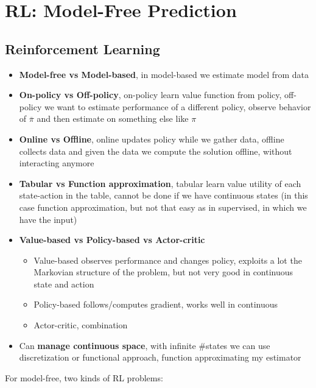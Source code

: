 
\section{RL: Model-Free Prediction}
\subsection{Reinforcement Learning}
\begin{itemize}
    \item \textbf{Model-free vs Model-based}, in model-based we estimate model from data
    \item \textbf{On-policy vs Off-policy}, on-policy learn value function from policy, off-policy we want to estimate performance of a different policy, observe behavior of $\overline{\pi}$ and then estimate on something else like $\pi$
    \item \textbf{Online vs Offline}, online updates policy while we gather data, offline collects data and given the data we compute the solution offline, without interacting anymore
    \item \textbf{Tabular vs Function approximation}, tabular learn value utility of each state-action in the table, cannot be 	done if we have continuous states (in this case function approximation, but not that easy as in supervised, in which we have the input)
    \item \textbf{Value-based vs Policy-based vs Actor-critic}
    \begin{itemize}
        \item Value-based observes performance and changes policy, exploits a lot the Markovian structure of the problem, but not very good in continuous state and action
        \item Policy-based follows/computes gradient, works well in continuous
        \item Actor-critic, combination
    \end{itemize}
    \item Can \textbf{manage continuous space}, with infinite \#states we can use discretization or functional approach, function approximating my estimator
\end{itemize}
For model-free, two kinds of RL problems:
